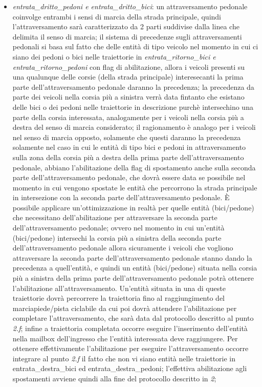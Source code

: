 \begin{enumerate}
\begin{enumerate}
\begin{itemize}
\item \textit{en\-tra\-ta\_drit\-to\_pe\-do\-ni e en\-tra\-ta\_drit\-to\_bi\-ci}: un attraversamento pedonale coinvolge entrambi i sensi di marcia della strada principale, quindi l'attraversamento sarà caratterizzato da 2 parti suddivise dalla linea che delimita il senso di marcia; il sistema di precedenze sugli attraversamenti pedonali si basa sul fatto che delle entità di tipo veicolo nel momento in cui ci siano dei pedoni o bici nelle traiettorie in \textit{en\-tra\-ta\_ri\-tor\-no\_bi\-ci e en\-tra\-ta\_ri\-tor\-no\_pe\-do\-ni} con flag di abilitazione, allora i veicoli presenti su una qualunque delle corsie (della strada principale) interesecanti la prima parte dell'attraversamento pedonale daranno la precedenza; la precedenza da parte dei veicoli nella corsia più a sinistra verrà data fintanto che esistano delle bici o dei pedoni nelle traiettorie in descrizione purchè intersechino una parte della corsia interessata, analogamente per i veicoli nella corsia più a destra del senso di marcia considerato; il ragionamento è analogo per i veicoli nel senso di marcia opposto, solamente che questi daranno la precedenza solamente nel caso in cui le entità di tipo bici e pedoni in attraversamento sulla zona della corsia più a destra della prima parte dell'attraversamento pedonale, abbiano l'abilitazione della flag di spostamento anche sulla seconda parte dell'attraversamento pedonale, che dovrà essere data se possibile nel momento in cui vengono spostate le entità che percorrono la strada principale in intersezione con la seconda parte dell'attraversamento pedonale. È possibile applicare un'ottimizzazione in realtà per quelle entità (bici/pedone) che necessitano dell'abilitazione per attraversare la seconda parte dell'attraversamento pedonale; ovvero nel momento in cui un'entità (bici/pedone) intersechi la corsia più a sinistra della seconda parte dell'attraversamento pedonale allora sicuramente i veicoli che vogliono attraversare la seconda parte dell'attraversamento pedonale stanno dando la precedenza a quell'entità, e quindi un entità (bici/pedone) situata nella corsia più a sinistra della prima parte dell'attraversamento pedonale potrà ottenere l'abilitazione all'attraversamento. Un'entità situata in una di queste traiettorie dovrà percorrere la traiettoria fino al raggiungimento del marciapiede/pista ciclabile da cui poi dovrà attendere l'abilitazione per completare l'attraversamento, che sarà data dal protocollo descritto al punto \textit{2.f}; infine a traiettoria completata occorre eseguire l'inserimento dell'entità nella mailbox dell'ingresso che l'entità interessata deve raggiungere. Per ottenere effettivamente l'abilitazione per eseguire l'attraversamento occorre integrare al punto \textit{2.f} il fatto che non vi siano entità nelle traiettorie in en\-tra\-ta\_des\-tra\_bi\-ci ed en\-tra\-ta\_des\-tra\_pe\-do\-ni; l'effettiva abilitazione agli spostamenti avviene quindi alla fine del protocollo descritto in \textit{2};

\end{itemize}
\end{enumerate}
\end{enumerate}
